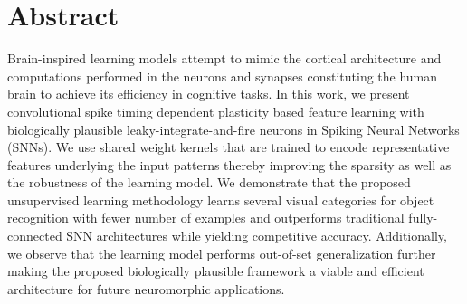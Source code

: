 \documentclass[journal, onecolumn]{IEEEtran}
\begin{document}

\maketitle
\thispagestyle{plain}
\pagestyle{plain}


%


\vspace{-5.0ex}

\section*{\large\bf{Abstract}}
Brain-inspired learning models attempt to mimic the cortical architecture and computations performed in the neurons and synapses constituting the human brain to achieve its efficiency in cognitive tasks. In this work, we present convolutional spike timing dependent plasticity based feature learning with biologically plausible leaky-integrate-and-fire neurons in Spiking Neural Networks (SNNs). We use shared weight kernels that are trained to encode representative features underlying the input patterns thereby improving the sparsity as well as the robustness of the learning model. We demonstrate that the proposed unsupervised learning methodology learns several visual categories for object recognition with fewer number of examples and outperforms traditional fully-connected SNN architectures while yielding competitive accuracy. Additionally, we observe that the learning model performs out-of-set generalization further making the proposed biologically plausible framework a viable and efficient architecture for future neuromorphic applications.
\end{document}
